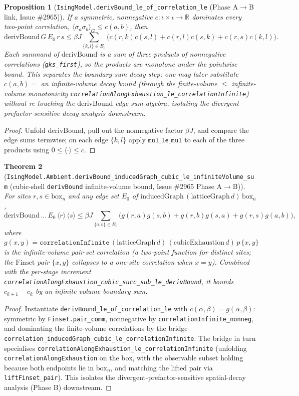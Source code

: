 \documentclass[a4paper,11pt]{article}
\newtheorem{theorem}{Theorem}
\newtheorem{proposition}[theorem]{Proposition}
\begin{document}
\begin{proposition}[\texttt{IsingModel.derivBound\_le\_of\_correlation\_le}
(Phase A$\to$B link, Issue \#2965)]
If a symmetric, nonnegative $c\colon\iota\times\iota\to\mathbb{R}$ dominates every
two-point correlation, $\langle\sigma_a\sigma_b\rangle_G\le c(a,b)$, then
\[
  \mathrm{derivBound}\,G\,E_0\,r\,s
  \le \beta J\sum_{\{k,l\}\in E_0}\bigl(c(r,k)c(s,l)+c(r,l)c(s,k)+c(r,s)c(k,l)\bigr).
\]
Each summand of $\mathrm{derivBound}$ is a sum of three products of nonnegative
correlations (\texttt{gks\_first}), so the products are monotone under the pointwise
bound. This separates the boundary-sum decay step: one may later substitute
$c(a,b)=$ an infinite-volume decay bound (through the finite-volume $\le$
infinite-volume monotonicity
\texttt{correlationAlongExhaustion\_le\_correlationInfinite}) without re-touching the
$\mathrm{derivBound}$ edge-sum algebra, isolating the divergent-prefactor-sensitive
decay analysis downstream.
\end{proposition}

\begin{proof}
Unfold $\mathrm{derivBound}$, pull out the nonnegative factor $\beta J$, and compare
the edge sums termwise; on each edge $\{k,l\}$ apply $\mathtt{mul\_le\_mul}$ to each of
the three products using $0\le\langle\cdot\rangle\le c$.
\end{proof}

\begin{theorem}[\texttt{IsingModel.Ambient.derivBound\_inducedGraph\_cubic\_le\_infiniteVolume\_sum}
(cubic-shell \texttt{derivBound} infinite-volume bound, Issue \#2965 Phase A$\to$B)]
For sites $r,s\in\mathrm{box}_n$ and any edge set $E_0$ of
$\mathrm{inducedGraph}\,(\mathrm{latticeGraph}\,d)\,\mathrm{box}_n$,
\[
  \mathrm{derivBound}\,\dots\,E_0\,\langle r\rangle\,\langle s\rangle
  \le \beta J\sum_{\{a,b\}\in E_0}\bigl(g(r,a)g(s,b)+g(r,b)g(s,a)+g(r,s)g(a,b)\bigr),
\]
where $g(x,y)=\texttt{correlationInfinite}\,(\mathrm{latticeGraph}\,d)\,
(\mathrm{cubicExhaustion}\,d)\,p\,\{x,y\}$ is the infinite-volume pair-set
correlation (a two-point function for distinct sites; the $\mathrm{Finset}$ pair
$\{x,y\}$ collapses to a one-site correlation when $x=y$). Combined with the
per-stage increment
\texttt{correlationAlongExhaustion\_cubic\_succ\_sub\_le\_derivBound}, it bounds
$c_{k+1}-c_k$ by an infinite-volume boundary sum.
\end{theorem}

\begin{proof}
Instantiate \texttt{derivBound\_le\_of\_correlation\_le} with
$c(\alpha,\beta)=g(\alpha,\beta)$: symmetric by \texttt{Finset.pair\_comm},
nonnegative by \texttt{correlationInfinite\_nonneg}, and dominating the
finite-volume correlations by the bridge
\texttt{correlation\_inducedGraph\_cubic\_le\_correlationInfinite}. The bridge in
turn specialises \texttt{correlationAlongExhaustion\_le\_correlationInfinite}
(unfolding \texttt{correlationAlongExhaustion} on the box, with the observable
subset holding because both endpoints lie in $\mathrm{box}_n$, and matching the
lifted pair via \texttt{liftFinset\_pair}). This isolates the
divergent-prefactor-sensitive spatial-decay analysis (Phase B) downstream.
\end{proof}
\end{document}
